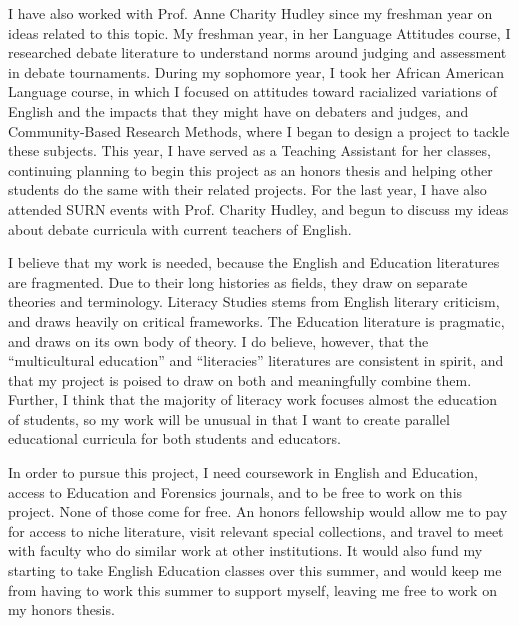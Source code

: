 \documentclass[man,12pt,natbib]{apa6}
\begin{document}
I have also worked with Prof. Anne Charity Hudley since my freshman year on
ideas related to this topic. 
My freshman year, in her Language Attitudes course, I researched debate
literature to understand norms around judging and assessment in debate
tournaments. During my sophomore year, I took her African American Language
course, in which I focused on attitudes toward racialized variations of English and the impacts that they might have on
debaters and judges, and Community-Based Research Methods, where I began to
design a project to tackle these subjects. This year, I have served as a
Teaching Assistant for her classes, continuing planning to begin this project
as an honors thesis and helping other students do the same with their related
projects.  For the last year, I have also attended SURN events with Prof.
Charity Hudley, and begun to discuss my ideas about debate curricula with
current teachers of English.

I believe that my work is needed, because the English and Education literatures
are fragmented. Due to their long histories as fields, they draw on separate
theories and terminology. Literacy Studies stems from English literary
criticism, and draws heavily on critical frameworks. The Education literature
is pragmatic, and draws on its own body of theory. I do believe, however, that
the ``multicultural education'' and ``literacies'' literatures are consistent
in spirit, and that my project is poised to draw on both and meaningfully
combine them.  Further, I think that the majority of literacy work focuses
almost the education of students, so my work will be unusual in that I want to
create parallel educational curricula for both students and educators.

In order to pursue this project, I need coursework in English and Education,
access to Education and Forensics journals, and to be free to work on this
project. None of those come for free. An honors fellowship would allow me to
pay for access to niche literature, visit relevant special collections, and
travel to meet with faculty who do similar work at other institutions. It would
also fund my starting to take English Education classes over this summer, and
would keep me from having to work this summer to support myself, leaving me
free to work on my honors thesis.


\clearpage

\end{document}
